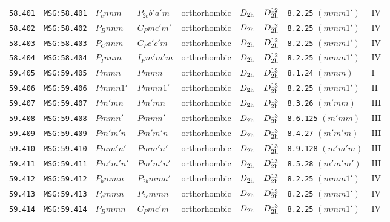 \documentclass[fleqn,10pt]{jsarticle}
\begin{document}
\begin{center}
\begin{longtable}{lllllllll}
\texttt{58.401} & \texttt{MSG:58.401} & $P_{c}nnm$ & $P_{2c}b'a'm$ & orthorhombic & $D_{\rm 2h}$ & $D_{\rm 2h}^{12}$ & \texttt{8.2.25} $(mmm1')$ & IV \\
\texttt{58.402} & \texttt{MSG:58.402} & $P_{B}nnm$ & $C_{P}mc'm'$ & orthorhombic & $D_{\rm 2h}$ & $D_{\rm 2h}^{12}$ & \texttt{8.2.25} $(mmm1')$ & IV \\
\texttt{58.403} & \texttt{MSG:58.403} & $P_{C}nnm$ & $C_{P}c'c'm$ & orthorhombic & $D_{\rm 2h}$ & $D_{\rm 2h}^{12}$ & \texttt{8.2.25} $(mmm1')$ & IV \\
\texttt{58.404} & \texttt{MSG:58.404} & $P_{I}nnm$ & $I_{P}m'm'm$ & orthorhombic & $D_{\rm 2h}$ & $D_{\rm 2h}^{12}$ & \texttt{8.2.25} $(mmm1')$ & IV \\ \hline
\texttt{59.405} & \texttt{MSG:59.405} & $Pmmn$ & $Pmmn$ & orthorhombic & $D_{\rm 2h}$ & $D_{\rm 2h}^{13}$ & \texttt{8.1.24} $(mmm)$ & I \\
\texttt{59.406} & \texttt{MSG:59.406} & $Pmmn1'$ & $Pmmn1'$ & orthorhombic & $D_{\rm 2h}$ & $D_{\rm 2h}^{13}$ & \texttt{8.2.25} $(mmm1')$ & II \\
\texttt{59.407} & \texttt{MSG:59.407} & $Pm'mn$ & $Pm'mn$ & orthorhombic & $D_{\rm 2h}$ & $D_{\rm 2h}^{13}$ & \texttt{8.3.26} $(m'mm)$ & III \\
\texttt{59.408} & \texttt{MSG:59.408} & $Pmmn'$ & $Pmmn'$ & orthorhombic & $D_{\rm 2h}$ & $D_{\rm 2h}^{13}$ & \texttt{8.6.125} $(m'mm)$ & III \\
\texttt{59.409} & \texttt{MSG:59.409} & $Pm'm'n$ & $Pm'm'n$ & orthorhombic & $D_{\rm 2h}$ & $D_{\rm 2h}^{13}$ & \texttt{8.4.27} $(m'm'm)$ & III \\
\texttt{59.410} & \texttt{MSG:59.410} & $Pmm'n'$ & $Pmm'n'$ & orthorhombic & $D_{\rm 2h}$ & $D_{\rm 2h}^{13}$ & \texttt{8.9.128} $(m'm'm)$ & III \\
\texttt{59.411} & \texttt{MSG:59.411} & $Pm'm'n'$ & $Pm'm'n'$ & orthorhombic & $D_{\rm 2h}$ & $D_{\rm 2h}^{13}$ & \texttt{8.5.28} $(m'm'm')$ & III \\
\texttt{59.412} & \texttt{MSG:59.412} & $P_{b}mmn$ & $P_{2b}mma'$ & orthorhombic & $D_{\rm 2h}$ & $D_{\rm 2h}^{13}$ & \texttt{8.2.25} $(mmm1')$ & IV \\
\texttt{59.413} & \texttt{MSG:59.413} & $P_{c}mmn$ & $P_{2c}mmn$ & orthorhombic & $D_{\rm 2h}$ & $D_{\rm 2h}^{13}$ & \texttt{8.2.25} $(mmm1')$ & IV \\
\texttt{59.414} & \texttt{MSG:59.414} & $P_{B}mmn$ & $C_{P}mc'm$ & orthorhombic & $D_{\rm 2h}$ & $D_{\rm 2h}^{13}$ & \texttt{8.2.25} $(mmm1')$ & IV \\

\end{longtable}
\end{center}
\end{document}
